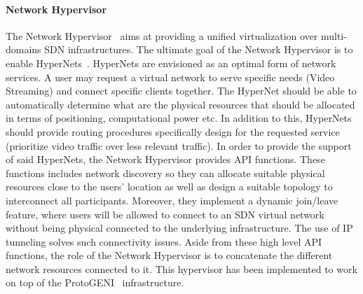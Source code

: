 \paragraph{Network Hypervisor}
The Network Hypervisor~\cite{NetworkHypervisor-Huang2013} aims at providing a unified virtualization over multi-domains SDN infrastructures. 
The ultimate goal of the Network Hypervisor is to enable HyperNets~\cite{HyperNet-Huang2013a}. HyperNets are envisioned as an optimal form of network services. A user may request a virtual network to serve specific needs (\eg Video Streaming) and connect specific clients together.
The HyperNet should be able to automatically determine what are the physical resources that should be allocated in terms of positioning, computational power etc. In addition to this, HyperNets should provide routing procedures specifically design for the requested service (\ie prioritize video traffic over less relevant traffic).
In order to provide the support of said HyperNets, the Network Hypervisor provides API functions. These functions includes network discovery so they can allocate suitable physical resources close to the users' location as well as design a suitable topology to interconnect all participants.
Moreover, they implement a dynamic join/leave feature, where users will be allowed to connect to an SDN virtual network without being physical connected to the underlying infrastructure. The use of IP tunneling solves such connectivity issues.
Aside from these high level API functions, the role of the Network Hypervisor is to concatenate the different network resources connected to it.
This hypervisor has been implemented to work on top of the ProtoGENI~\cite{protoGENI} infrastructure.

